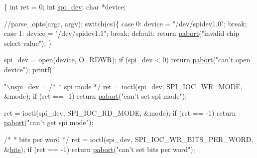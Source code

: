 \begin{DoxyCode}
\{
        \textcolor{keywordtype}{int} ret = 0;
        \textcolor{keywordtype}{int} \hyperlink{CommunicationV0_2communication_8c_a4788f0a5355494bc6c13690e28f43783}{spi\_dev};
        \textcolor{keywordtype}{char} *device;

        \textcolor{comment}{//parse\_opts(argc, argv);}
        \textcolor{keywordflow}{switch}(cs)\{
          \textcolor{keywordflow}{case} 0:
            device = \textcolor{stringliteral}{"/dev/spidev1.0"};
            \textcolor{keywordflow}{break};
          \textcolor{keywordflow}{case} 1:
            device = \textcolor{stringliteral}{"/dev/spidev1.1"};
            \textcolor{keywordflow}{break};
          \textcolor{keywordflow}{default}:
            \textcolor{keywordflow}{return} \hyperlink{spi__functions_01_07C_xC3_xB3pia_01em_01conflito_01de_01Andr_xC3_xA9_01Carvalho_012013-04-26_08_8c_aabfca8320b0c76774f01467703e17302}{pabort}(\textcolor{stringliteral}{"invalid chip select value"});
        \}
            
        
        spi\_dev = open(device, O\_RDWR);
        \textcolor{keywordflow}{if} (spi\_dev < 0)
                \textcolor{keywordflow}{return} \hyperlink{spi__functions_01_07C_xC3_xB3pia_01em_01conflito_01de_01Andr_xC3_xA9_01Carvalho_012013-04-26_08_8c_aabfca8320b0c76774f01467703e17302}{pabort}(\textcolor{stringliteral}{"can't open device"});
printf(\textcolor{stringliteral}{"\(\backslash\)nspi\_dev = %
        \textcolor{comment}{/*}
\textcolor{comment}{         * spi mode}
\textcolor{comment}{         */}
        ret = ioctl(spi\_dev, SPI\_IOC\_WR\_MODE, &mode);
        \textcolor{keywordflow}{if} (ret == -1)
                \textcolor{keywordflow}{return} \hyperlink{spi__functions_01_07C_xC3_xB3pia_01em_01conflito_01de_01Andr_xC3_xA9_01Carvalho_012013-04-26_08_8c_aabfca8320b0c76774f01467703e17302}{pabort}(\textcolor{stringliteral}{"can't set spi mode"});

        ret = ioctl(spi\_dev, SPI\_IOC\_RD\_MODE, &mode);
        \textcolor{keywordflow}{if} (ret == -1)
                \textcolor{keywordflow}{return} \hyperlink{spi__functions_01_07C_xC3_xB3pia_01em_01conflito_01de_01Andr_xC3_xA9_01Carvalho_012013-04-26_08_8c_aabfca8320b0c76774f01467703e17302}{pabort}(\textcolor{stringliteral}{"can't get spi mode"});

        \textcolor{comment}{/*}
\textcolor{comment}{         * bits per word}
\textcolor{comment}{         */}
        ret = ioctl(spi\_dev, SPI\_IOC\_WR\_BITS\_PER\_WORD, &\hyperlink{spi__functions_01_07C_xC3_xB3pia_01em_01conflito_01de_01Andr_xC3_xA9_01Carvalho_012013-04-26_08_8c_a46a6da6b1936191571fd30b2a749f38c}{bits});
        \textcolor{keywordflow}{if} (ret == -1)
                \textcolor{keywordflow}{return} \hyperlink{spi__functions_01_07C_xC3_xB3pia_01em_01conflito_01de_01Andr_xC3_xA9_01Carvalho_012013-04-26_08_8c_aabfca8320b0c76774f01467703e17302}{pabort}(\textcolor{stringliteral}{"can't set bits per word"});

}
\end{DoxyCode}
